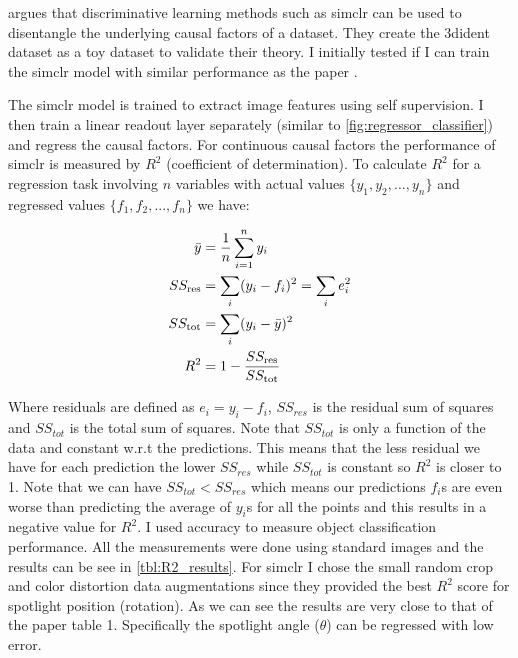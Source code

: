 \documentclass[../thesis.tex]{subfiles}
\begin{document}
\cite{3dident} argues that discriminative learning methods such as simclr can be used to disentangle the underlying causal factors of a dataset. They create the 3dident dataset as a toy dataset to validate their theory. I initially tested if I can train the simclr model with similar performance as the paper \cite{3dident}. 

The simclr model is trained to extract image features using self supervision. I then train a linear readout layer separately (similar to \ref{fig:regressor_classifier}) and regress the causal factors. For continuous causal factors the performance of simclr is measured by $R^2$ (coefficient of determination). To calculate $R^2$ for a regression task involving $n$ variables with actual values $\{ y_1, y_2, ..., y_n \}$ and regressed values $\{ f_1, f_2, ..., f_n \}$ we have: 

\begin{align}
	\bar{y}&=\frac{1}{n}\sum_{i=1}^n y_i \\
	SS_\text{res}&=\sum_i (y_i - f_i)^2=\sum_i e_i^2 \\
	SS_\text{tot}&=\sum_i (y_i - \bar{y})^2 \\
	R^2 &= 1 - {SS_{\rm res}\over SS_{\rm tot}} 
\end{align} 

Where residuals are defined as $e_i = y_i - f_i$, $SS_{res}$ is the residual sum of squares and $SS_{tot}$ is the total sum of squares. Note that $SS_{tot}$ is only a function of the data and constant w.r.t the predictions. This means that the less residual we have for each prediction the lower $SS_{res}$ while $SS_{tot}$ is constant so $R^2$ is closer to 1. Note that we can have $SS_{tot} < SS_{res}$ which means our predictions $f_i$s are even worse than predicting the average of $y_i$s for all the points and this results in a negative value for $R^2$. I used accuracy to measure object classification performance. All the measurements were done using standard images and the results can be see in \ref{tbl:R2_results}. For simclr I chose the small random crop and color distortion data augmentations since they provided the best  $R^2$ score for spotlight position (rotation). As we can see the results are very close to that of the paper \cite{3dident} table 1. Specifically the spotlight angle ($\theta$) can be regressed with low error.  
\end{document}
